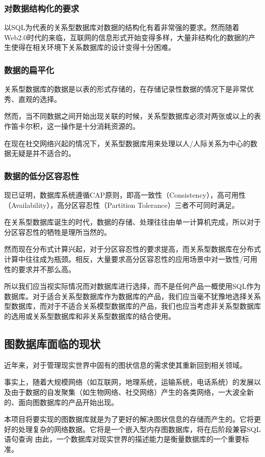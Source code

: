 \documentclass[a4paper]{ecust_thesis_openning}
\begin{document}
			\subsubsection{对数据结构化的要求}
				以SQL为代表的关系型数据库对数据的结构化有着非常强的要求。然而随着Web2.0时代的来临，互联网的信息形式开始变得多样，大量非结构化的数据的产生使得在相关环境下关系数据库的设计变得十分困难。
			\subsubsection{数据的扁平化}
				关系型数据库的数据是以表的形式存储的，在存储记录性数据的情况下是非常优秀、直观的选择。

				然而，当不同数据之间开始出现关联的时候，关系型数据库必须对两张或以上的表作笛卡尔积，这一操作是十分消耗资源的。

				在现在社交网络兴起的情况下，关系型数据库用来处理以人/人际关系为中心的数据无疑是并不适合的。
			\subsubsection{数据的低分区容忍性}
				现已证明，数据库系统遵循CAP原则，即高一致性（Consistency），高可用性（Availability），高分区容忍性（Partition Tolerance）三者不可同时满足。

				在关系型数据库诞生的时代，数据的存储、处理往往由单一计算机完成，所以对于分区容忍性的牺牲是理所当然的。

				然而现在分布式计算兴起，对于分区容忍性的要求提高，而关系型数据库在分布式计算中往往成为瓶颈。相反，大量要求高分区容忍性的应用场景中对一致性/可用性的要求并不那么高。

				所以我们应当视实际情况而对数据库进行选择，而不是任何产品一概使用SQL作为数据库。对于适合关系型数据库作为数据库的产品，我们应当毫不犹豫地选择关系型数据库，而对于不适合关系模型数据库的产品，我们也应当考虑非关系型数据库的选用或关系型数据库和非关系型数据库的结合使用。

	\subsection{图数据库面临的现状}
		近年来，对于管理现实世界中固有的图状信息的需求使其重新回到相关领域。
		
		事实上，随着大规模网络（如互联网，地理系统，运输系统，电话系统）的发展以及由于数据的自发聚集（如生物网络、社交网络）产生的各类网络，一大波全新的、面向图数据库的产品开始出现。
		
		本项目将要实现的图数据库就是为了更好的解决图状信息的存储而产生的。它将更好的处理复杂的网络数据。它将是一个嵌入型内存图数据库，将在后阶段兼容SQL语句查询	由此，一个数据库对现实世界的描述能力是衡量数据库的一个重要标准。
\end{document}
